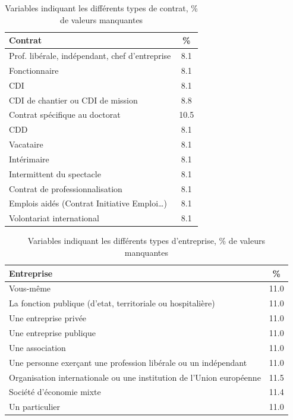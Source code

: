 \documentclass[12pt, a4paper, titlepage, table]{article}
\begin{document}
\begin{table}[H]
	\centering
	\begin{tabularx}{\textwidth}{|X|c|}
		\hline
		\textbf{Contrat} & \textbf{\%} \\
		\hline
		Prof. libérale, indépendant, chef d’entreprise & 8.1 \\
		\hline
		Fonctionnaire & 8.1 \\
		\hline
		CDI & 8.1 \\
		\hline
		CDI de chantier ou CDI de mission & 8.8 \\
		\hline
		Contrat spécifique au doctorat & 10.5 \\
		\hline
		CDD & 8.1 \\
		\hline
		Vacataire & 8.1 \\
		\hline
		Intérimaire & 8.1 \\
		\hline
		Intermittent du spectacle & 8.1 \\
		\hline
		Contrat de professionnalisation & 8.1 \\
		\hline
		Emplois aidés (Contrat Initiative Emploi…) & 8.1 \\
		\hline
		Volontariat international & 8.1 \\
		\hline
	\end{tabularx}
	\caption{Variables indiquant les différents types de contrat, \% de valeurs manquantes}
	\label{tab:contrats}
\end{table}

\begin{table}[H]
	\centering
	\begin{tabularx}{\textwidth}{|X|c|}
		\hline
		\textbf{Entreprise} & \textbf{\%} \\
		\hline
		Vous-même & 11.0 \\
		\hline
		La fonction publique (d'etat, territoriale ou hospitalière) & 11.0 \\
		\hline
		Une entreprise privée & 11.0 \\
		\hline
		Une entreprise publique & 11.0 \\
		\hline
		Une association & 11.0 \\
		\hline
		Une personne exerçant une profession libérale ou un indépendant & 11.0 \\
		\hline
		Organisation internationale ou une institution de l'Union européenne & 11.5 \\
		\hline
		Société d'économie mixte & 11.4 \\
		\hline
		Un particulier & 11.0 \\
		\hline
	\end{tabularx}
	\caption{Variables indiquant les différents types d'entreprise, \% de valeurs manquantes}
	\label{tab:entreprise}
\end{table}
\end{document}
